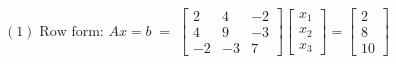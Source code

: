 \documentclass[preview]{standalone}
\begin{document}
\begin{align*}
(1)\; \text{Row form: } A x = b \;=\; \begin{bmatrix} 2 & 4 & -2 \\ 4 & 9 & -3 \\ -2 & -3 & 7 \end{bmatrix} \begin{bmatrix} x_1 \\ x_2 \\ x_3 \end{bmatrix} = \begin{bmatrix} 2 \\ 8 \\ 10 \end{bmatrix}
\end{align*}
\end{document}
